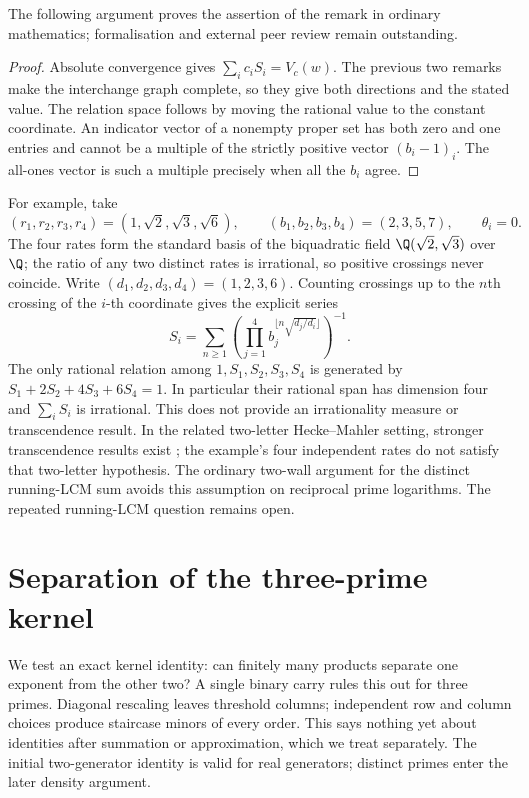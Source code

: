 The following argument proves the assertion of the remark in ordinary
mathematics; formalisation and external peer review remain outstanding.

\begin{proof}
Absolute convergence gives $\sum_i c_iS_i=V_c(w)$.  The previous
two remarks make the interchange graph complete, so they give both
directions and the stated value.  The relation space follows by moving
the rational value to the constant coordinate.  An indicator vector of
a nonempty proper set has both zero and one entries and cannot be a
multiple of the strictly positive vector $(b_i-1)_i$.  The all-ones
vector is such a multiple precisely when all the $b_i$ agree.
\end{proof}

For example, take
\[
 (r_1,r_2,r_3,r_4)=(1,\sqrt2,\sqrt3,\sqrt6),\qquad
 (b_1,b_2,b_3,b_4)=(2,3,5,7),\qquad \theta_i=0.
\]
The four rates form the standard basis of the biquadratic field
$\Q(\sqrt2,\sqrt3)$ over $\Q$; the ratio of any two distinct rates is
irrational, so positive crossings never coincide.  Write
$(d_1,d_2,d_3,d_4)=(1,2,3,6)$.  Counting crossings up to the $n$th
crossing of the $i$-th coordinate gives the explicit series
\begin{equation}\label{long269:eq:four-clocks}
 S_i=\sum_{n\ge1}\left(
       \prod_{j=1}^4 b_j^{\lfloor n\sqrt{d_j/d_i}\rfloor}
                        \right)^{-1}.
\end{equation}
The only rational relation among $1,S_1,S_2,S_3,S_4$ is generated by
$S_1+2S_2+4S_3+6S_4=1$.  In particular their rational span has
dimension four and $\sum_iS_i$ is irrational.  This does not provide an
irrationality measure or transcendence result.  In the related
two-letter Hecke--Mahler setting, stronger transcendence results exist
\cite{bugeaudlaurent2023}; the example's four independent rates do not
satisfy that two-letter hypothesis.  The ordinary two-wall argument for the distinct running-LCM sum avoids
this assumption on reciprocal prime logarithms.  The repeated
running-LCM question remains open.


\section{Separation of the three-prime kernel}\label{long269:sec:rank}

We test an exact kernel identity: can finitely many products separate
one exponent from the other two? A single binary carry rules this out
for three primes. Diagonal rescaling leaves threshold columns; independent
row and column choices produce staircase minors of every order.
This says nothing yet about identities after summation or approximation,
which we treat separately. The initial two-generator identity is valid
for real generators; distinct primes enter the later density argument.


